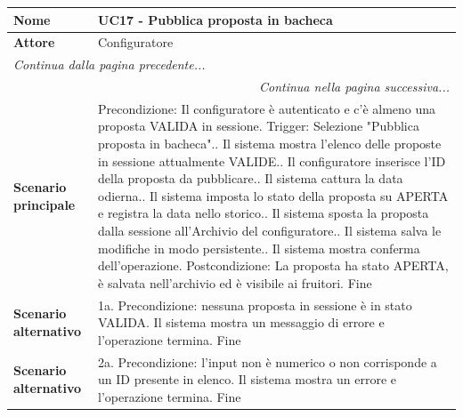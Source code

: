 \documentclass[12pt, a4paper, oneside]{report}
\begin{document}
\begin{tabularx}{\textwidth}{|l|X|}
    \hline
    \textbf{Nome}               & \textbf{UC17 - Pubblica proposta in bacheca} \\ \hline
    \textbf{Attore}             & Configuratore \\ \hline
    \endfirsthead 

    \hline
    \multicolumn{2}{|l|}{\textit{Continua dalla pagina precedente...}} \\ \hline
    \endhead 

    \hline
    \multicolumn{2}{|r|}{\textit{Continua nella pagina successiva...}} \\ \hline
    \endfoot 

    \hline
    \endlastfoot

    \textbf{Scenario principale} & 
    Precondizione: Il configuratore è autenticato e c'è almeno una proposta VALIDA in sessione.\newline
    Trigger: Selezione "Pubblica proposta in bacheca".\newline
    1. Il sistema mostra l'elenco delle proposte in sessione attualmente VALIDE.\newline
    2. Il configuratore inserisce l'ID della proposta da pubblicare.\newline
    3. Il sistema cattura la data odierna.\newline
    4. Il sistema imposta lo stato della proposta su APERTA e registra la data nello storico.\newline
    5. Il sistema sposta la proposta dalla sessione all'Archivio del configuratore.\newline
    6. Il sistema salva le modifiche in modo persistente.\newline
    7. Il sistema mostra conferma dell'operazione.\newline
    Postcondizione: La proposta ha stato APERTA, è salvata nell'archivio ed è visibile ai fruitori. \newline
    Fine \\ \hline
    
    \textbf{Scenario alternativo} & 
    1a. Precondizione: nessuna proposta in sessione è in stato VALIDA. \newline
    Il sistema mostra un messaggio di errore e l'operazione termina.\newline
    Fine \\ \hline

    \textbf{Scenario alternativo} & 
    2a. Precondizione: l'input non è numerico o non corrisponde a un ID presente in elenco. \newline
    Il sistema mostra un errore e l'operazione termina.\newline
    Fine \\ \hline
\end{tabularx}
\end{document}
